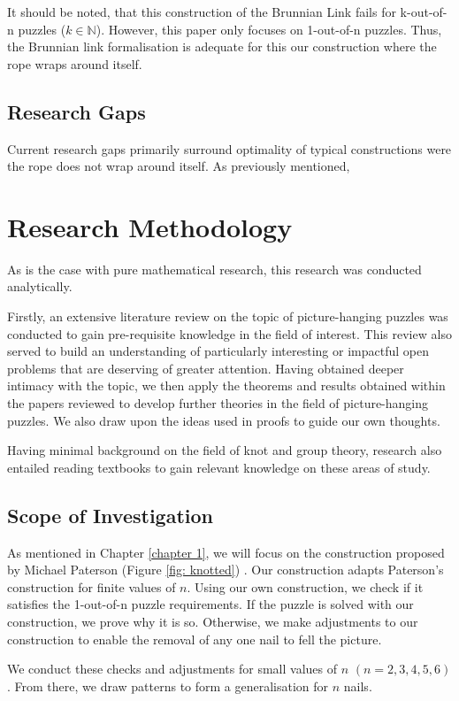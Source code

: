 \documentclass[12pt]{article}
\begin{document}
It should be noted, that this construction of the Brunnian Link fails for k-out-of-n puzzles ($k \in \mathbb{N}$).
However, this paper only focuses on 1-out-of-n puzzles. 
Thus, the Brunnian link formalisation is adequate for this our construction where the rope wraps around itself.


\subsection{Research Gaps}
Current research gaps primarily surround optimality of typical constructions were the rope does not wrap around itself.
As previously mentioned, 

\pagebreak
\section{Research Methodology} \label{chapter 3}
As is the case with pure mathematical research, this research was conducted analytically. 

Firstly, an extensive literature review on the topic of picture-hanging puzzles was conducted to gain pre-requisite knowledge in the field of interest. 
This review also served to build an understanding of particularly interesting or impactful open problems that are deserving of greater attention. 
Having obtained deeper intimacy with the topic, we then apply the theorems and results obtained within the papers reviewed to develop further theories in the field of picture-hanging puzzles. 
We also draw upon the ideas used in proofs to guide our own thoughts.

Having minimal background on the field of knot and group theory, research also entailed reading textbooks to gain relevant knowledge on these areas of study.

\subsection{Scope of Investigation}
As mentioned in Chapter \ref{chapter 1}, we will focus on the construction proposed by Michael Paterson (Figure \ref{fig: knotted}) \cite{Demaine_2013}.
Our construction adapts Paterson's construction for finite values of $n$.
Using our own construction, we check if it satisfies the 1-out-of-n puzzle requirements.
If the puzzle is solved with our construction, we prove why it is so.
Otherwise, we make adjustments to our construction to enable the removal of any one nail to fell the picture.

We conduct these checks and adjustments for small values of $n$ $(n = 2, 3, 4, 5, 6)$.
From there, we draw patterns to form a generalisation for $n$ nails.
\end{document}
